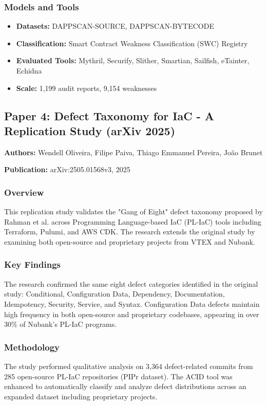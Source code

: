 \documentclass[11pt,a4paper]{article}
\begin{document}
\subsubsection{Models and Tools}
\begin{itemize}
    \item \textbf{Datasets:} DAPPSCAN-SOURCE, DAPPSCAN-BYTECODE
    \item \textbf{Classification:} Smart Contract Weakness Classification (SWC) Registry
    \item \textbf{Evaluated Tools:} Mythril, Securify, Slither, Smartian, Sailfish, eTainter, Echidna
    \item \textbf{Scale:} 1,199 audit reports, 9,154 weaknesses
\end{itemize}

\subsection{Paper 4: Defect Taxonomy for IaC - A Replication Study (arXiv 2025)}

\textbf{Authors:} Wendell Oliveira, Filipe Paiva, Thiago Emmanuel Pereira, João Brunet

\textbf{Publication:} arXiv:2505.01568v3, 2025

\subsubsection{Overview}
This replication study validates the "Gang of Eight" defect taxonomy proposed by Rahman et al. across Programming Language-based IaC (PL-IaC) tools including Terraform, Pulumi, and AWS CDK. The research extends the original study by examining both open-source and proprietary projects from VTEX and Nubank.

\subsubsection{Key Findings}
The research confirmed the same eight defect categories identified in the original study: Conditional, Configuration Data, Dependency, Documentation, Idempotency, Security, Service, and Syntax. Configuration Data defects maintain high frequency in both open-source and proprietary codebases, appearing in over 30\% of Nubank's PL-IaC programs.

\subsubsection{Methodology}
The study performed qualitative analysis on 3,364 defect-related commits from 285 open-source PL-IaC repositories (PIPr dataset). The ACID tool was enhanced to automatically classify and analyze defect distributions across an expanded dataset including proprietary projects.
\end{document}
